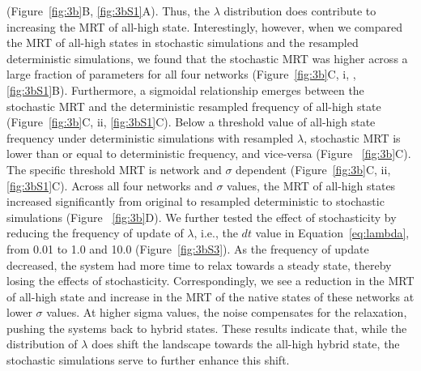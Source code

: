 \documentclass[11pt]{article}
\begin{document}
(Figure~\ref{fig:3b}B, \ref{fig:3bS1}A). Thus, the $\lambda$ distribution does contribute to increasing the MRT of all-high state. Interestingly, however, when we compared the MRT of all-high states in stochastic simulations and the resampled deterministic simulations, we found that the stochastic MRT was higher across a large fraction of parameters for all four networks (Figure~\ref{fig:3b}C, i, , \ref{fig:3bS1}B). Furthermore, a sigmoidal relationship emerges between the stochastic MRT and the deterministic resampled frequency of all-high state (Figure~\ref{fig:3b}C, ii, \ref{fig:3bS1}C). Below a threshold value of all-high state frequency under deterministic simulations with resampled $\lambda$, stochastic MRT is lower than or equal to deterministic frequency, and vice-versa (Figure ~\ref{fig:3b}C). The specific threshold MRT is network and $\sigma$ dependent (Figure~\ref{fig:3b}C, ii, \ref{fig:3bS1}C). Across all four networks and $\sigma$ values, the MRT of all-high states increased significantly from original to resampled deterministic to stochastic simulations (Figure ~\ref{fig:3b}D). We further tested the effect of stochasticity by reducing the frequency of update of $\lambda$, i.e., the $dt$ value in Equation~\ref{eq:lambda}, from 0.01 to 1.0 and 10.0 (Figure~\ref{fig:3bS3}). As the frequency of update decreased, the system had more time to relax towards a steady state, thereby losing the effects of stochasticity. Correspondingly, we see a reduction in the MRT of all-high state and increase in the MRT of the native states of these networks at lower $\sigma$ values. At higher sigma values, the noise compensates for the relaxation, pushing the systems back to hybrid states. These results indicate that, while the distribution of $\lambda$ does shift the landscape towards the all-high hybrid state, the stochastic simulations serve to further enhance this shift. 
\end{document}
